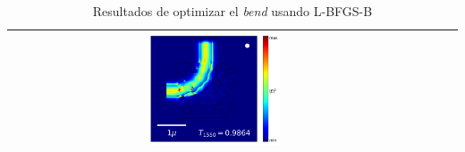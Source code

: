 \begin{table}[ht]
\begin{tabular}{|c|c|c|c|}
      \includegraphics[width=0.33\textwidth]{image/results/bend/L-BFGS-B/visualize_field_fab_512.png} \\
    \hline
    \end{tabular}
    \hspace*{-3cm}
    \caption{Resultados de optimizar el \emph{bend} usando L-BFGS-B}
    \label{tab:opt-LBFGSB-bend}
\end{table}

